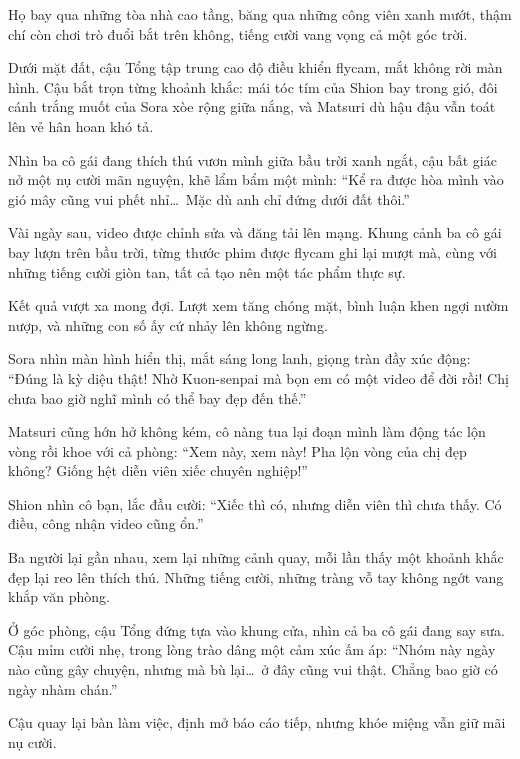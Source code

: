 \documentclass[../main.tex]{subfiles}
\begin{document}
Họ bay qua những tòa nhà cao tầng, băng qua những công viên xanh mướt, thậm chí còn chơi trò đuổi bắt trên không, tiếng cười vang vọng cả một góc trời.

Dưới mặt đất, cậu Tổng tập trung cao độ điều khiển flycam, mắt không rời màn hình. Cậu bắt trọn từng khoảnh khắc: mái tóc tím của Shion bay trong gió, đôi cánh trắng muốt của Sora xòe rộng giữa nắng, và Matsuri dù hậu đậu vẫn toát lên vẻ hân hoan khó tả.

Nhìn ba cô gái đang thích thú vươn mình giữa bầu trời xanh ngắt, cậu bất giác nở một nụ cười mãn nguyện, khẽ lẩm bẩm một mình: ``Kể ra được hòa mình vào gió mây cũng vui phết nhỉ\dots\ Mặc dù anh chỉ đứng dưới đất thôi.''

\ct

Vài ngày sau, video được chỉnh sửa và đăng tải lên mạng. Khung cảnh ba cô gái bay lượn trên bầu trời, từng thước phim được flycam ghi lại mượt mà, cùng với những tiếng cười giòn tan, tất cả tạo nên một tác phẩm thực sự.

Kết quả vượt xa mong đợi. Lượt xem tăng chóng mặt, bình luận khen ngợi nườm nượp, và những con số ấy cứ nhảy lên không ngừng.

Sora nhìn màn hình hiển thị, mắt sáng long lanh, giọng tràn đầy xúc động: ``Đúng là kỳ diệu thật! Nhờ Kuon-senpai mà bọn em có một video để đời rồi! Chị chưa bao giờ nghĩ mình có thể bay đẹp đến thế.''

Matsuri cũng hớn hở không kém, cô nàng tua lại đoạn mình làm động tác lộn vòng rồi khoe với cả phòng: ``Xem này, xem này! Pha lộn vòng của chị đẹp không? Giống hệt diễn viên xiếc chuyên nghiệp!''

Shion nhìn cô bạn, lắc đầu cười: ``Xiếc thì có, nhưng diễn viên thì chưa thấy. Có điều, công nhận video cũng ổn.''

Ba người lại gần nhau, xem lại những cảnh quay, mỗi lần thấy một khoảnh khắc đẹp lại reo lên thích thú. Những tiếng cười, những tràng vỗ tay không ngớt vang khắp văn phòng.

Ở góc phòng, cậu Tổng đứng tựa vào khung cửa, nhìn cả ba cô gái đang say sưa. Cậu mỉm cười nhẹ, trong lòng trào dâng một cảm xúc ấm áp: ``Nhóm này ngày nào cũng gây chuyện, nhưng mà bù lại\dots\ ở đây cũng vui thật. Chẳng bao giờ có ngày nhàm chán.''

Cậu quay lại bàn làm việc, định mở báo cáo tiếp, nhưng khóe miệng vẫn giữ mãi nụ cười.
\end{document}
